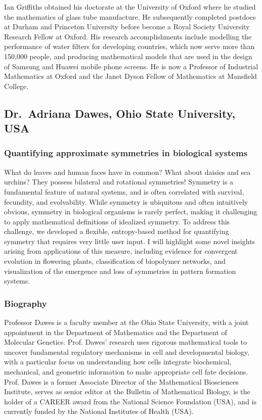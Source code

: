 \documentclass[12pt,a4paper]{article}
\begin{document}
Ian Griffiths obtained his doctorate at the University of Oxford where he studied the mathematics of glass tube manufacture. He subsequently completed postdocs at Durham and Princeton University before become a Royal Society University Research Fellow at Oxford. His research accomplishments include modelling the performance of water filters for developing countries, which now serve more than 150,000 people, and producing mathematical models that are used in the design of Samsung and Huawei mobile phone screens. He is now a Professor of Industrial Mathematics at Oxford and the Janet Dyson Fellow of Mathematics at Mansfield College.

\subsection{Dr.~Adriana Dawes, Ohio State University, USA}

\subsubsection{Quantifying approximate symmetries in biological systems}

What do leaves and human faces have in common? What about daisies and sea urchins? They possess bilateral and rotational symmetries! Symmetry is a fundamental feature of natural systems, and is often correlated with survival, fecundity, and evolvability. While symmetry is ubiquitous and often intuitively obvious, symmetry in biological organisms is rarely perfect, making it challenging to apply mathematical definitions of idealized symmetry. To address this challenge, we developed a flexible, entropy-based method for quantifying symmetry that requires very little user input. I will highlight some novel insights arising from applications of this measure, including evidence for convergent evolution in flowering plants, classification of biopolymer networks, and visualization of the emergence and loss of symmetries in pattern formation systems.

\subsubsection{Biography}

Professor Dawes is a faculty member at the Ohio State University, with a joint appointment in the Department of Mathematics and the Department of Molecular Genetics. Prof. Dawes' research uses rigorous mathematical tools to uncover fundamental regulatory mechanisms in cell and developmental biology, with a particular focus on understanding how cells integrate biochemical, mechanical, and geometric information to make appropriate cell fate decisions. Prof. Dawes is a former Associate Director of the Mathematical Biosciences Institute, serves as senior editor at the Bulletin of Mathematical Biology, is the holder of a CAREER award from the National Science Foundation (USA), and is currently funded by the National Institutes of Health (USA).
\end{document}
